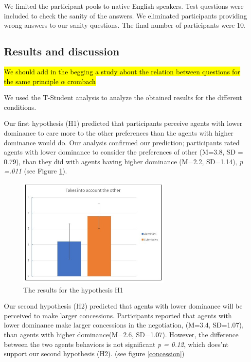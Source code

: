 \documentclass{llncs}
\begin{document}
	
	We limited the participant pools to native English speakers. Test questions were included to check the sanity of the answers. We eliminated participants providing wrong answers to our sanity questions. The final number of participants were 10. 
	
	\subsection{Results and discussion}
	\hl{We should add in the begging a study about the relation between questions for the same principle $\alpha$ crombach}
	
	
	\par We used the T-Student analysis to analyze the obtained results for the different conditions. 
	
	

	Our first hypothesis (H1) predicted that participants perceive agents with  lower dominance to care more to the other preferences than the  agents with higher dominance would do. Our analysis confirmed our prediction; participants rated agents with lower dominance to consider the preferences of other (M=3.8, SD = 0.79), than they did with agents having higher dominance (M=2.2, SD=1.14), \emph{p =.011} (see Figure \ref{considerOther}).
				\begin{figure}[h]
					\centering
					\caption{\label{considerOther} The results for the  hypothesis H1}
					\includegraphics[width=3in]{plots/considerOther}
				\end{figure}
	
	\par Our second hypothesis (H2) predicted that agents with lower dominance will be perceived to make larger concessions. Participants reported that agents with lower dominance  make larger concessions in the negotiation, (M=3.4, SD=1.07), than agents with higher dominance(M=2.6, SD=1.07). However, the difference between the two agents behaviors is not significant \emph{p = 0.12}, which does'nt support our second hypothesis (H2). (see figure  \ref{concession})
	
\end{document}
